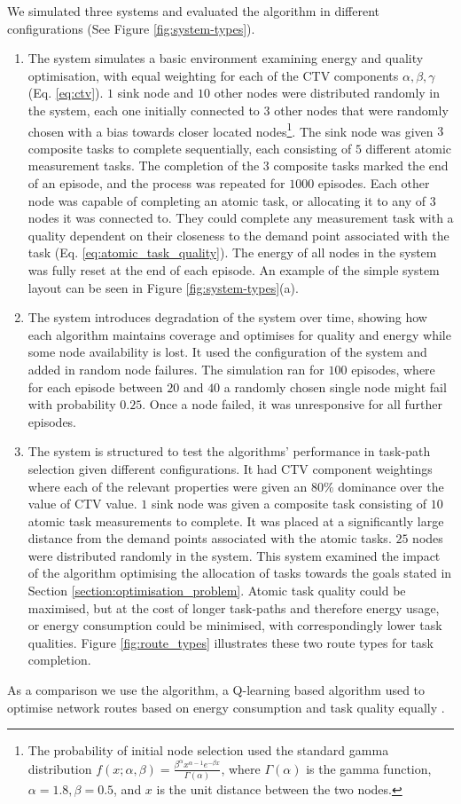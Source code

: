 We simulated three systems and evaluated the algorithm in different configurations (See Figure \ref{fig:system-types}).  
\begin{enumerate}
	\item The \simulationSimple{}{} system simulates a basic environment examining energy and quality optimisation, with  equal weighting for each of the CTV components $\alpha, \beta, \gamma$ (Eq. \ref{eq:ctv}). $1$ sink node and $10$ other nodes were distributed randomly in the system, each one initially connected to $3$ other nodes that were randomly chosen with a bias towards closer located nodes\footnote{
		The probability of initial node selection used the standard gamma distribution $f(x; \alpha, \beta) = \frac{\beta^{\alpha} x^{\alpha-1}e^{- \beta x}}   {\Gamma(\alpha)}$, where $\Gamma(\alpha)$ is the  gamma function, $\alpha=1.8, \beta=0.5$, and $x$ is the unit distance between the two nodes.
	}. 
	The sink node was given $3$ composite tasks to complete sequentially, each consisting of $5$ different atomic measurement tasks. The completion of the $3$ composite tasks marked the end of an episode, and the process was repeated for $1000$ episodes. Each other node was capable of completing an atomic task, or allocating it to any of $3$ nodes it was connected to. They could complete any measurement task with a quality dependent on their closeness to the demand point associated with the task (Eq. \ref{eq:atomic_task_quality}). The energy of all nodes in the system was fully reset at the end of each episode. An example of the simple system layout can be seen in Figure \ref{fig:system-types}(a). 

	\item The \simulationNodeFailure{}{} system introduces degradation of the system over time, showing how each algorithm maintains coverage and optimises for quality and energy while some node availability is lost. It used the configuration of the \simulationSimple{}{} system and added in random node failures. The simulation ran for $100$ episodes, where for each episode between $20$ and $40$  a randomly chosen single node might fail with probability $0.25$. Once a node failed, it was unresponsive for all further episodes. 
	
	\item The \simulationExtended{}{} system is structured to test the algorithms' performance in task-path selection given different configurations. 
	It had CTV component weightings where each of the relevant properties were given an $80\%$ dominance over the value of CTV value. $1$ sink node was given a composite task consisting of $10$ atomic task measurements to complete. It was placed at a significantly large distance from the demand points associated with the atomic tasks. $25$ nodes were distributed randomly in the system. This system examined the impact of the algorithm optimising the allocation of tasks towards the goals stated in Section \ref{section:optimisation_problem}. Atomic task quality could be maximised, but at the cost of longer task-paths and therefore energy usage, or energy consumption could be minimised, with correspondingly lower task qualities. Figure \ref{fig:route_types} illustrates these two route types for task completion.
\end{enumerate}
  As a comparison we use the \acronymQRouting{}{} algorithm, a Q-learning based algorithm  used to optimise network routes based on energy consumption and task quality equally \citep{XXX, XXX}.